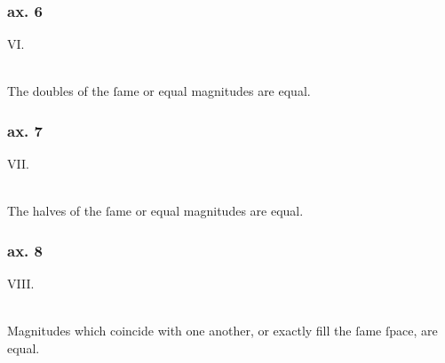 \begin{minipage}{0.165\textwidth}
    \phantom{}
\end{minipage}%

\hfill

\begin{minipage}{0.165\textwidth}
    \phantom{}
\end{minipage}%
\begin{minipage}{0.67\textwidth}
    \subsubsection{ax. 6}
    \begin{center}
        VI.\label{ax6}\\
        \hfill\\
        \raggedright The doubles of the ſame or equal magnitudes are equal.\\
    \end{center}
    \subsubsection{ax. 7}
    \begin{center}
        VII.\label{ax7}\\
        \hfill\\
        \raggedright The halves of the ſame or equal magnitudes are equal.\\
    \end{center}
    \subsubsection{ax. 8}
    \begin{center}
        VIII.\label{ax8}\\
        \hfill\\
        \raggedright Magnitudes which coincide with one another, or exactly fill the ſame ſpace, are equal.
    \end{center}
\end{minipage}%
\begin{minipage}{0.165\textwidth}
    \phantom{}
\end{minipage}%

\hfill

